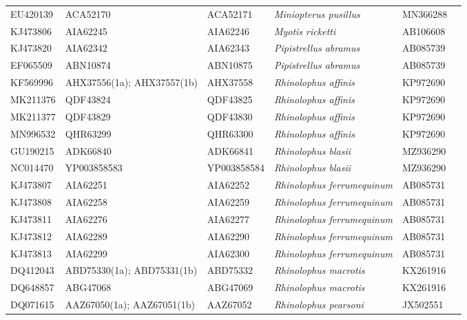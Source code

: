 \documentclass[9pt]{article}
\begin{document}
\begin{landscape}
\begin{longtable}{p{2cm} p{3cm} p{2.7cm} p{5.7cm} p{2cm} p{2cm}}
EU420139 &ACA52170&ACA52171&\textit{Miniopterus pusillus} &MN366288& \cite{chu2008genomic} \\
KJ473806&AIA62245&AIA62246&\textit{Myotis ricketti}&AB106608& \cite{wu2016deciphering, kawai2003status} \\
KJ473820&AIA62342&AIA62343&\textit{Pipistrellus abramus}&AB085739& \cite{wu2016orf8, sakai2003molecular} \\
EF065509 &ABN10874&ABN10875&\textit{Pipistrellus abramus} &AB085739& \cite{sakai2003molecular,woo2007comparative} \\
KF569996&AHX37556(1a); AHX37557(1b)&AHX37558&\textit{Rhinolophus affinis}&KP972690& \cite{woo2007comparative} \\
MK211376&QDF43824&QDF43825&\textit{Rhinolophus affinis}&KP972690& \cite{woo2007comparative, he2014identification} \\
MK211377&QDF43829&QDF43830&\textit{Rhinolophus affinis}&KP972690& \cite{woo2007comparative, he2014identification} \\
MN996532&QHR63299&QHR63300&\textit{Rhinolophus affinis}&KP972690& \cite{woo2007comparative, zhou2020pneumonia} \\
GU190215&ADK66840&ADK66841&\textit{Rhinolophus blasii}&MZ936290& \cite{curran2022new, drexler2010genomic} \\
NC014470&YP003858583&YP003858584&\textit{Rhinolophus blasii}&MZ936290& \cite{curran2022new,drexler2010genomic}\\
KJ473807&AIA62251&AIA62252&\textit{Rhinolophus ferrumequinum}&AB085731& \cite{sakai2003molecular, wu2016deciphering} \\
KJ473808&AIA62258&AIA62259&\textit{Rhinolophus ferrumequinum}&AB085731& \cite{sakai2003molecular, wu2016deciphering} \\
KJ473811&AIA62276&AIA62277&\textit{Rhinolophus ferrumequinum}&AB085731& \cite{sakai2003molecular, wu2016deciphering} \\
KJ473812&AIA62289&AIA62290&\textit{Rhinolophus ferrumequinum}&AB085731& \cite{sakai2003molecular, wu2016deciphering} \\
KJ473813&AIA62299&AIA62300&\textit{Rhinolophus ferrumequinum}&AB085731& \cite{sakai2003molecular, wu2016deciphering} \\
DQ412043&ABD75330(1a); ABD75331(1b)&ABD75332&\textit{Rhinolophus macrotis}&KX261916& \cite{sun2016complex} \\
DQ648857&ABG47068&ABG47069&\textit{Rhinolophus macrotis}&KX261916& \cite{sun2016complex}\\
DQ071615&AAZ67050(1a); AAZ67051(1b)&AAZ67052&\textit{Rhinolophus pearsoni}&JX502551& \cite{li2005bats}\\

\end{longtable}
\end{landscape}
\end{document}

